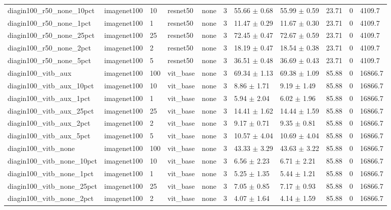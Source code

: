 \begin{tabular}{lllllllllll}
diagin100_r50_none_10pct & imagenet100 & 10 & resnet50 & none & 3 & 55.66 $\pm$ 0.68 & 55.99 $\pm$ 0.59 & 23.71 & 0 & 4109.7 \\
diagin100_r50_none_1pct & imagenet100 & 1 & resnet50 & none & 3 & 11.47 $\pm$ 0.29 & 11.67 $\pm$ 0.30 & 23.71 & 0 & 4109.7 \\
diagin100_r50_none_25pct & imagenet100 & 25 & resnet50 & none & 3 & 72.45 $\pm$ 0.47 & 72.67 $\pm$ 0.59 & 23.71 & 0 & 4109.7 \\
diagin100_r50_none_2pct & imagenet100 & 2 & resnet50 & none & 3 & 18.19 $\pm$ 0.47 & 18.54 $\pm$ 0.38 & 23.71 & 0 & 4109.7 \\
diagin100_r50_none_5pct & imagenet100 & 5 & resnet50 & none & 3 & 36.51 $\pm$ 0.48 & 36.69 $\pm$ 0.43 & 23.71 & 0 & 4109.7 \\
diagin100_vitb_aux & imagenet100 & 100 & vit_base & none & 3 & 69.34 $\pm$ 1.13 & 69.38 $\pm$ 1.09 & 85.88 & 0 & 16866.7 \\
diagin100_vitb_aux_10pct & imagenet100 & 10 & vit_base & none & 3 & 8.86 $\pm$ 1.71 & 9.19 $\pm$ 1.49 & 85.88 & 0 & 16866.7 \\
diagin100_vitb_aux_1pct & imagenet100 & 1 & vit_base & none & 3 & 5.94 $\pm$ 2.04 & 6.02 $\pm$ 1.96 & 85.88 & 0 & 16866.7 \\
diagin100_vitb_aux_25pct & imagenet100 & 25 & vit_base & none & 3 & 14.41 $\pm$ 1.62 & 14.44 $\pm$ 1.59 & 85.88 & 0 & 16866.7 \\
diagin100_vitb_aux_2pct & imagenet100 & 2 & vit_base & none & 3 & 9.17 $\pm$ 0.71 & 9.35 $\pm$ 0.81 & 85.88 & 0 & 16866.7 \\
diagin100_vitb_aux_5pct & imagenet100 & 5 & vit_base & none & 3 & 10.57 $\pm$ 4.04 & 10.69 $\pm$ 4.04 & 85.88 & 0 & 16866.7 \\
diagin100_vitb_none & imagenet100 & 100 & vit_base & none & 3 & 43.33 $\pm$ 3.29 & 43.63 $\pm$ 3.22 & 85.88 & 0 & 16866.7 \\
diagin100_vitb_none_10pct & imagenet100 & 10 & vit_base & none & 3 & 6.56 $\pm$ 2.23 & 6.71 $\pm$ 2.21 & 85.88 & 0 & 16866.7 \\
diagin100_vitb_none_1pct & imagenet100 & 1 & vit_base & none & 3 & 5.25 $\pm$ 1.35 & 5.44 $\pm$ 1.21 & 85.88 & 0 & 16866.7 \\
diagin100_vitb_none_25pct & imagenet100 & 25 & vit_base & none & 3 & 7.05 $\pm$ 0.85 & 7.17 $\pm$ 0.93 & 85.88 & 0 & 16866.7 \\
diagin100_vitb_none_2pct & imagenet100 & 2 & vit_base & none & 3 & 4.07 $\pm$ 1.64 & 4.14 $\pm$ 1.59 & 85.88 & 0 & 16866.7 \\

\end{tabular}
